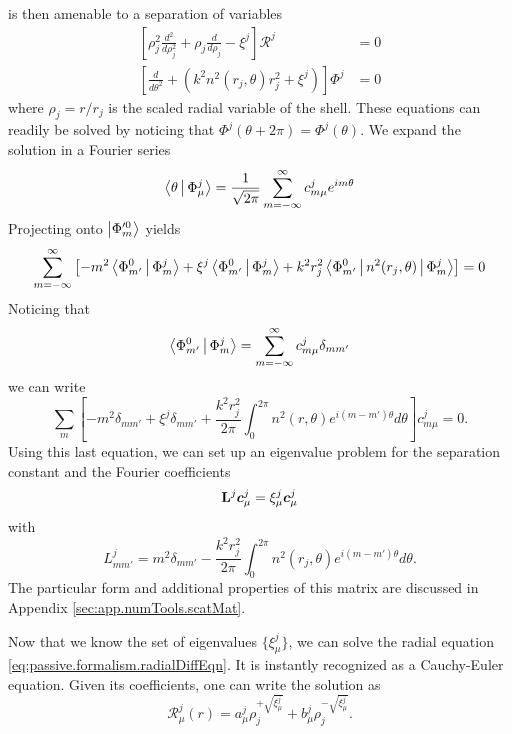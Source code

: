 is then amenable to a separation of variables
  \begin{subequations}
  \begin{align}
   \left[\rho_j^2\frac{d^2}{d\rho_j^2}+\rho_j\frac{d}{d\rho_j}-\xi^j\right]\mathcal{R}^j	&=0	\label{eq:passive.formalism.radialDiffEqn}	\\
   \left[\frac{d}{d\theta^2}+\left(k^2n^2(r_j,\theta)r_j^2+\xi^j\right)\right]\Phi^j		&=0
  \end{align}
  \end{subequations}
where $\rho_j=r/r_j$ is the scaled radial variable of the shell. 
These equations can readily be solved by noticing that
$\Phi^j(\theta+2\pi)=\Phi^j(\theta)$. We expand the solution
in a Fourier series
  \begin{equation}
   \Braket{\theta|\Phi_\mu^j} = \frac{1}{\sqrt{2\pi}}\sum_{m=-\infty}^\infty c_{m\mu}^je^{im\theta}
  \end{equation}
Projecting onto $\Ket{\Phi_m'^0}$ yields
\begin{equation}
    \sum_{m=-\infty}^\infty\left[-m^2\Braket{\Phi_{m'}^0|\Phi_m^j}+\xi^j\Braket{\Phi_{m'}^0|\Phi_m^j}+k^2r_j^2\Braket{\Phi_{m'}^0|n^2(r_j,\theta)|\Phi_m^j}\right]=0
  \end{equation}
Noticing that 
  \begin{equation}
    \Braket{\Phi_{m'}^0|\Phi_{m}^j} = \sum_{m=-\infty}^\infty c_{m\mu}^j \delta_{mm'}
  \end{equation}
we can write
  \begin{equation}
    \sum_m\left[-m^2\delta_{mm'}+\xi^j\delta_{mm'} + \frac{k^2r_j^2}{2\pi}\int_{0}^{2\pi}n^2(r,\theta)e^{i(m-m')\theta}d\theta\right]c_{m\mu}^j =0.
  \end{equation}
Using this last equation, we can set up an eigenvalue 
problem for the separation constant and the Fourier coefficients
  \begin{equation}
   \label{eq:passive.numerical.eigenvalue}
   \mathbf{L}^j\boldsymbol{c}_\mu^j=\xi_\mu^j\boldsymbol{c}_\mu^j
  \end{equation}
with
  \begin{equation}
    L_{mm'}^j = m^2\delta_{mm'}-\frac{k^2r_j^2}{2\pi}\int_0^{2\pi}n^2(r_j,\theta)e^{i(m-m')\theta}d\theta.
  \end{equation}
The particular form and additional properties of this matrix are discussed in 
Appendix \ref{sec:app.numTools.scatMat}.

Now that we know the set of eigenvalues $\{\xi_\mu^j\}$, we can solve the radial
equation \eqref{eq:passive.formalism.radialDiffEqn}. It is instantly recognized as 
a Cauchy-Euler equation. Given its coefficients, one can write the solution 
as \cite[p.~118-119]{GRE98}
  \begin{equation}
    \label{eq:sMatrix.radialSolution}
    \mathcal{R}_\mu^j(r) =  a_\mu^j\rho_j^{+\sqrt{\xi_\mu^j}}+b_\mu^j\rho_j^{-\sqrt{\xi_\mu^j}}.
  \end{equation}
  
